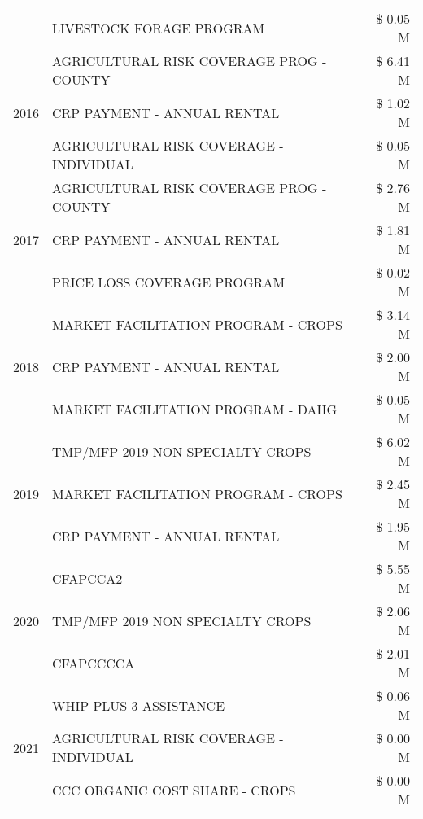 \begin{tabular}{llr}
 & LIVESTOCK FORAGE PROGRAM & \$ 0.05 M \\
\cline{1-3}
\multirow[t]{3}{*}{2016} & AGRICULTURAL RISK COVERAGE PROG - COUNTY      & \$ 6.41 M \\
 & CRP PAYMENT - ANNUAL RENTAL                   & \$ 1.02 M \\
 & AGRICULTURAL RISK COVERAGE - INDIVIDUAL       & \$ 0.05 M \\
\cline{1-3}
\multirow[t]{3}{*}{2017} & AGRICULTURAL RISK COVERAGE PROG - COUNTY & \$ 2.76 M \\
 & CRP PAYMENT - ANNUAL RENTAL & \$ 1.81 M \\
 & PRICE LOSS COVERAGE PROGRAM & \$ 0.02 M \\
\cline{1-3}
\multirow[t]{3}{*}{2018} & MARKET FACILITATION PROGRAM - CROPS & \$ 3.14 M \\
 & CRP PAYMENT - ANNUAL RENTAL & \$ 2.00 M \\
 & MARKET FACILITATION PROGRAM - DAHG & \$ 0.05 M \\
\cline{1-3}
\multirow[t]{3}{*}{2019} & TMP/MFP 2019 NON SPECIALTY CROPS & \$ 6.02 M \\
 & MARKET FACILITATION PROGRAM - CROPS & \$ 2.45 M \\
 & CRP PAYMENT - ANNUAL RENTAL & \$ 1.95 M \\
\cline{1-3}
\multirow[t]{3}{*}{2020} & CFAPCCA2 & \$ 5.55 M \\
 & TMP/MFP 2019 NON SPECIALTY CROPS & \$ 2.06 M \\
 & CFAPCCCCA & \$ 2.01 M \\
\cline{1-3}
\multirow[t]{3}{*}{2021} & WHIP PLUS 3 ASSISTANCE & \$ 0.06 M \\
 & AGRICULTURAL RISK COVERAGE - INDIVIDUAL & \$ 0.00 M \\
 & CCC ORGANIC COST SHARE - CROPS & \$ 0.00 M \\
\cline{1-3}
\bottomrule
\end{tabular}
